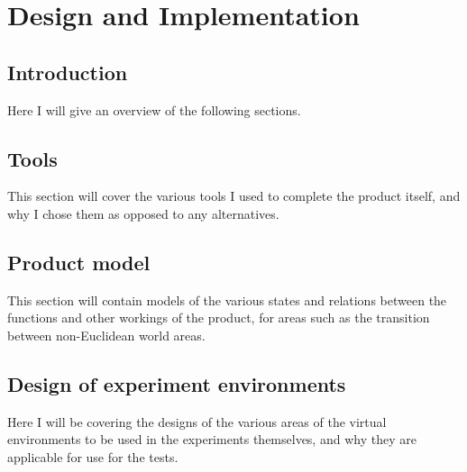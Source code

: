 \chapter{Design and Implementation}
\label{design}

\section{Introduction}
Here I will give an overview of the following sections.

\section{Tools}
This section will cover the various tools I used to complete the product itself, and why I chose them as opposed to any alternatives.

\section{Product model}
This section will contain models of the various states and relations between the functions and other workings of the product, for areas such as the transition between non-Euclidean world areas.

\section{Design of experiment environments}
Here I will be covering the designs of the various areas of the virtual environments to be used in the experiments themselves, and why they are applicable for use for the tests.
